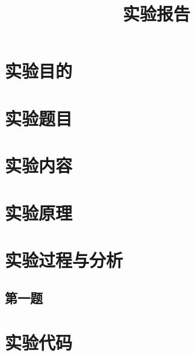 \documentclass{sysureport}
\title{实验报告}
\date{\zhtoday}
\begin{document}
\makecover
\makeheader


\section{实验目的}

\section{实验题目}


\section{实验内容}


\section{实验原理}


\section{实验过程与分析}
\subsection{第一题}


\section{实验代码}


\end{document}
